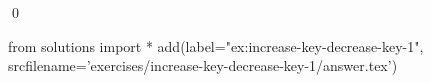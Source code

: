 
\begin{ex} 
  \label{ex:increase-key-decrease-key-1}
  
  \qed
\end{ex} 
\begin{python0}
from solutions import *
add(label="ex:increase-key-decrease-key-1",
    srcfilename='exercises/increase-key-decrease-key-1/answer.tex') 
\end{python0}
